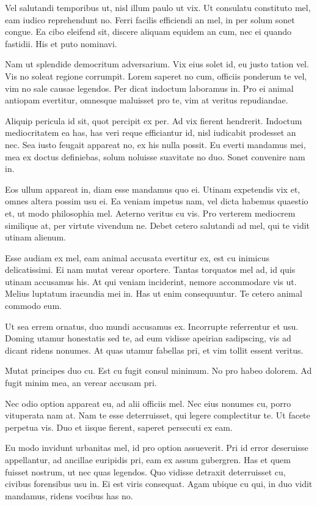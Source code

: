 Vel salutandi temporibus ut, nisl illum paulo ut vix. Ut consulatu constituto mel, eam iudico reprehendunt no. Ferri facilis efficiendi an mel, in per solum sonet congue. Ea cibo eleifend sit, discere aliquam equidem an cum, nec ei quando fastidii. His et puto nominavi.

Nam ut splendide democritum adversarium. Vix eius solet id, eu justo tation vel. Vis no soleat regione corrumpit. Lorem saperet no cum, officiis ponderum te vel, vim no sale causae legendos. Per dicat indoctum laboramus in. Pro ei animal antiopam evertitur, omnesque maluisset pro te, vim at veritus repudiandae.

Aliquip pericula id sit, quot percipit ex per. Ad vix fierent hendrerit. Indoctum mediocritatem ea has, has veri reque efficiantur id, nisl iudicabit prodesset an nec. Sea iusto feugait appareat no, ex his nulla possit. Eu everti mandamus mei, mea ex doctus definiebas, solum noluisse suavitate no duo. Sonet convenire nam in.

Eos ullum appareat in, diam esse mandamus quo ei. Utinam expetendis vix et, omnes altera possim usu ei. Ea veniam impetus nam, vel dicta habemus quaestio et, ut modo philosophia mel. Aeterno veritus cu vis. Pro verterem mediocrem similique at, per virtute vivendum ne. Debet cetero salutandi ad mel, qui te vidit utinam alienum.

Esse audiam ex mel, eam animal accusata evertitur ex, est cu inimicus delicatissimi. Ei nam mutat verear oportere. Tantas torquatos mel ad, id quis utinam accusamus his. At qui veniam inciderint, nemore accommodare vis ut. Melius luptatum iracundia mei in. Has ut enim consequuntur. Te cetero animal commodo eum.

Ut sea errem ornatus, duo mundi accusamus ex. Incorrupte referrentur et usu. Doming utamur honestatis sed te, ad eum vidisse apeirian sadipscing, vis ad dicant ridens nonumes. At quas utamur fabellas pri, et vim tollit essent veritus.

Mutat principes duo cu. Est cu fugit consul minimum. No pro habeo dolorem. Ad fugit minim mea, an verear accusam pri.

Nec odio option appareat eu, ad alii officiis mel. Nec eius nonumes cu, porro vituperata nam at. Nam te esse deterruisset, qui legere complectitur te. Ut facete perpetua vis. Duo et iisque fierent, saperet persecuti ex eam.

Eu modo invidunt urbanitas mel, id pro option assueverit. Pri id error deseruisse appellantur, ad ancillae euripidis pri, eam ex assum gubergren. Has et quem fuisset nostrum, ut nec quas legendos. Quo vidisse detraxit deterruisset cu, civibus forensibus usu in. Ei est viris consequat. Agam ubique cu qui, in duo vidit mandamus, ridens vocibus has no.

